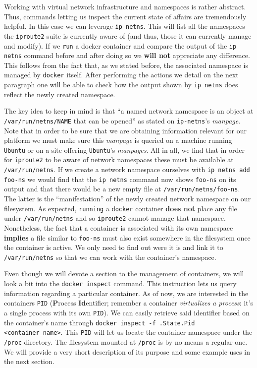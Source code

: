                 Working with virtual network infrastructure and namespaces is rather abstract. Thus, commands letting us inspect the current state of affairs are tremendously helpful. In this case we can leverage \texttt{ip netns}. This will list all the namespaces the \texttt{iproute2} suite is currently aware of (and thus, those it can currently manage and modify). If we \texttt{run} a docker container and compare the output of the \texttt{ip netns} command before and after doing so we \textbf{will not} appreciate any difference. This follows from the fact that, as we stated before, the associated namespace is managed by \texttt{docker} itself. After performing the actions we detail on the next paragraph one will be able to check how the output shown by \texttt{ip netns} does reflect the newly created namespace.

                The key idea to keep in mind is that ``a named network namespace is an object at \texttt{/var/run/netns/NAME} that can be opened'' as stated on \texttt{ip-netns}'s \textit{manpage}. Note that in order to be sure that we are obtaining information relevant for our platform we must make sure this \textit{manpage} is queried on a machine running \texttt{Ubuntu} or on a site offering \texttt{Ubuntu}'s \textit{manpages}. All in all, we find that in order for \texttt{iproute2} to be aware of network namespaces these must be available at \texttt{/var/run/netns}. If we create a network namespace ourselves with \texttt{ip netns add foo-ns} we would find that the \texttt{ip netns} command now shows \texttt{foo-ns} on its output and that there would be a new empty file at \texttt{/var/run/netns/foo-ns}. The latter is the ``manifestation'' of the newly created network namespace on our filesystem. As expected, \texttt{running} a \texttt{docker} container \textbf{does not} place any file under \texttt{/var/run/netns} and so \texttt{iproute2} cannot manage that namespace. Nonetheless, the fact that a container is associated with its own namespace \textbf{implies} a file similar to \texttt{foo-ns} must also exist somewhere in the filesystem once the container is active. We only need to find out were it is and link it to \texttt{/var/run/netns} so that we can work with the container's namespace.

                Even though we will devote a section to the management of containers, we will look a bit into the \texttt{docker inspect} command. This instruction lets us query information regarding a particular container. As of now, we are interested in the containers \texttt{PID} (\textbf{P}rocess \textbf{Id}entifier; remember a container \textit{virtualizes a process}: it's a single process with its own \texttt{PID}). We can easily retrieve said identifier based on the container's name through \texttt{docker inspect -f {{.State.Pid}} <container\_name>}. This \texttt{PID} will let us locate the container namespace under the \texttt{/proc} directory. The filesystem mounted at \texttt{/proc} is by no means a regular one. We will provide a very short description of its purpose and some example uses in the next section.

